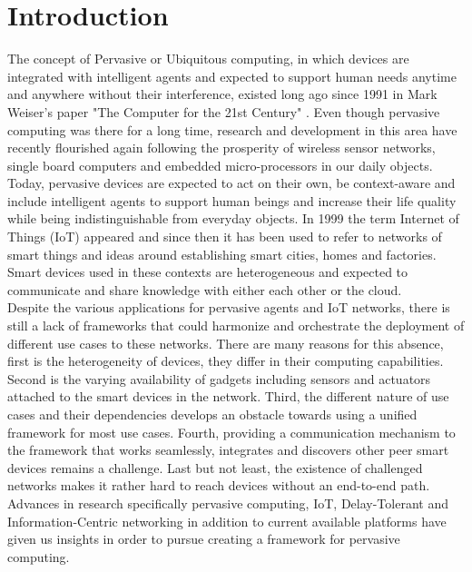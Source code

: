 
\chapter{Introduction}\label{chapter:introduction}
 The concept of Pervasive or Ubiquitous computing, in which devices are integrated with intelligent agents and expected to support human needs anytime and anywhere without their interference, existed long ago since 1991 in Mark Weiser's paper "The Computer for the 21st Century" \cite{weiser1991ubicomp}. Even though pervasive computing  was there for a long time, research and development in this area have recently flourished again following the  prosperity of wireless sensor networks, single board computers and embedded micro-processors in our daily objects. Today, pervasive devices are expected to act on their own, be context-aware and include intelligent agents to support human beings and increase their life quality while being indistinguishable from  everyday objects. In 1999 the term Internet of Things (IoT) appeared and since then it has been used to refer to networks of smart things and  ideas around establishing smart cities, homes and factories. Smart devices used in these contexts are heterogeneous and  expected to communicate and share knowledge with either each other or  the cloud.\\
 
 \noindent Despite the various applications for pervasive agents and IoT networks, there is still a lack of frameworks that could harmonize and orchestrate the deployment of different use cases to these networks. There are many reasons for this absence, first is the heterogeneity of devices, they differ in their computing capabilities. Second is the varying  availability of gadgets including sensors and actuators attached to the smart devices in the network. Third, the different nature of use cases and their dependencies develops an obstacle towards using a unified framework for most use cases. Fourth, providing a communication mechanism to the framework that works seamlessly, integrates and discovers other peer smart devices remains a challenge. Last but not least, the existence of challenged networks makes it rather hard to reach devices without an end-to-end path. Advances in research specifically  pervasive computing, IoT, Delay-Tolerant and Information-Centric networking in addition to current available platforms have given us insights in order to pursue creating a framework for pervasive computing.\\
 
